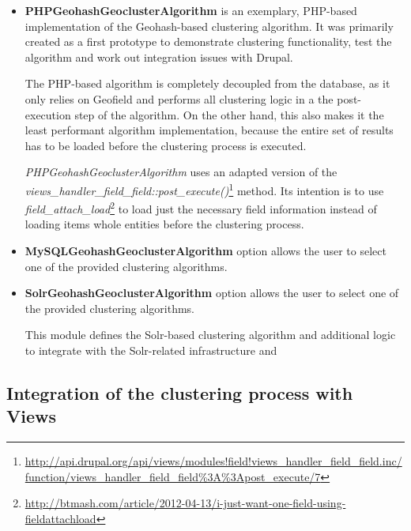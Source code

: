 \begin{itemize}

\item \textbf{PHPGeohashGeoclusterAlgorithm} is an exemplary, PHP-based implementation of the Geohash-based clustering algorithm. It was primarily created as a first prototype to demonstrate clustering functionality, test the algorithm and work out integration issues with Drupal.

The PHP-based algorithm is completely decoupled from the database, as it only relies on Geofield and performs all clustering logic in a the post-execution step of the algorithm. On the other hand, this also makes it the least performant algorithm implementation, because the entire set of results has to be loaded before the clustering process is executed.

\textit{PHPGeohashGeoclusterAlgorithm} uses an adapted version of the \\ \textit{views\_handler\_field\_field::post\_execute()}\footnote{\url{http://api.drupal.org/api/views/modules!field!views\_handler\_field\_field.inc/function/views\_handler\_field\_field\%3A\%3Apost\_execute/7}} method. Its intention is to use\\ \textit{field\_attach\_load}\footnote{\url{http://btmash.com/article/2012-04-13/i-just-want-one-field-using-fieldattachload}} to load just the necessary field information instead of loading items whole entities before the clustering process.


\item \textbf{MySQLGeohashGeoclusterAlgorithm} option allows the user to select one of the provided clustering algorithms.

\item \textbf{SolrGeohashGeoclusterAlgorithm} option allows the user to select one of the provided clustering algorithms.

This module defines the Solr-based clustering algorithm and additional logic to integrate with the Solr-related infrastructure and    

\end{itemize}

\subsection{Integration of the clustering process with Views}





